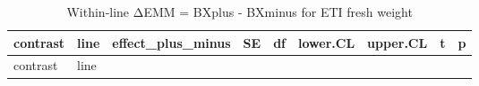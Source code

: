 \documentclass[
  10pt,
]{article}
\begin{document}
\begin{longtable}[]{@{}
  >{\raggedright\arraybackslash}p{}
  >{\raggedright\arraybackslash}p{}
  >{\raggedleft\arraybackslash}p{}
  >{\raggedleft\arraybackslash}p{}
  >{\raggedleft\arraybackslash}p{}
  >{\raggedleft\arraybackslash}p{}
  >{\raggedleft\arraybackslash}p{}
  >{\raggedleft\arraybackslash}p{}
  >{\raggedleft\arraybackslash}p{}@{}}
\caption{Within-line ΔEMM = BXplus - BXminus for ETI fresh
weight}\tabularnewline
\toprule\noalign{}
\begin{minipage}[b]{\linewidth}\raggedright
contrast
\end{minipage} & \begin{minipage}[b]{\linewidth}\raggedright
line
\end{minipage} & \begin{minipage}[b]{\linewidth}\raggedleft
effect\_plus\_minus
\end{minipage} & \begin{minipage}[b]{\linewidth}\raggedleft
SE
\end{minipage} & \begin{minipage}[b]{\linewidth}\raggedleft
df
\end{minipage} & \begin{minipage}[b]{\linewidth}\raggedleft
lower.CL
\end{minipage} & \begin{minipage}[b]{\linewidth}\raggedleft
upper.CL
\end{minipage} & \begin{minipage}[b]{\linewidth}\raggedleft
t
\end{minipage} & \begin{minipage}[b]{\linewidth}\raggedleft
p
\end{minipage} \\
\midrule\noalign{}
\endfirsthead
\toprule\noalign{}
\begin{minipage}[b]{\linewidth}\raggedright
contrast
\end{minipage} & \begin{minipage}[b]{\linewidth}\raggedright
line
\end{minipage} & \begin{minipage}[b]{\linewidth}\raggedleft

\end{minipage}
\end{longtable}
\end{document}
